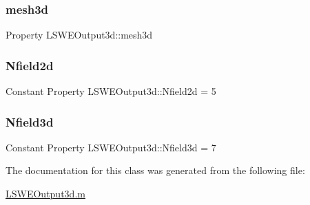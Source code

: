 \subsubsection{\texorpdfstring{mesh3d}{mesh3d}}
{\footnotesize\ttfamily Property L\+S\+W\+E\+Output3d\+::mesh3d\hspace{0.3cm}{\ttfamily [protected]}}

\mbox{\label{class_l_s_w_e_output3d_a9253e1bcd43a309440e3f5d871da732e}} 
\subsubsection{\texorpdfstring{Nfield2d}{Nfield2d}}
{\footnotesize\ttfamily Constant Property L\+S\+W\+E\+Output3d\+::\+Nfield2d = 5}

\mbox{\label{class_l_s_w_e_output3d_ac9e3bd7e41becfb93c18fe78d7b77e5f}} 
\subsubsection{\texorpdfstring{Nfield3d}{Nfield3d}}
{\footnotesize\ttfamily Constant Property L\+S\+W\+E\+Output3d\+::\+Nfield3d = 7}



The documentation for this class was generated from the following file\+:\begin{DoxyCompactItemize}
\item 
\hyperlink{_l_s_w_e_output3d_8m}{L\+S\+W\+E\+Output3d.\+m}\end{DoxyCompactItemize}
